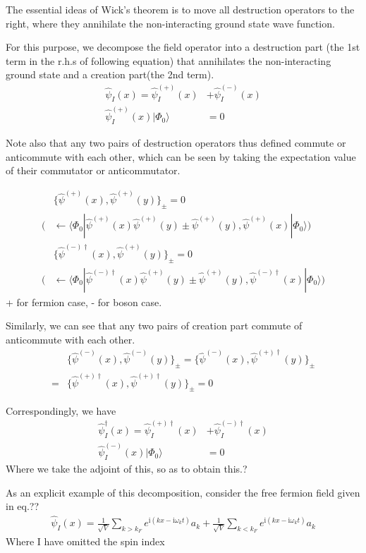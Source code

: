 ﻿\documentclass[twoside]{book}
\numberwithin{equation}{section}
\begin{document}
The essential ideas of Wick's theorem is to move all destruction operators to the right, where they annihilate the non-interacting ground state wave function.

For this purpose, we decompose the field operator into a destruction part (the 1st term in the r.h.s of following equation) that annihilates the non-interacting ground state and a creation part(the 2nd term).
\begin{align}
\hat \psi_{I}(x)=\hat \psi^{(+)}_{I}(x)&+\hat \psi^{(-)}_{I}(x) \nonumber \\
\hat \psi^{(+)}_{I}(x)|\Phi_0\rangle&=0 \nonumber
\end{align}

Note also that any two pairs of destruction operators thus defined commute or anticommute with each other, which can be seen by taking the expectation value of their commutator or anticommutator.

\begin{align}
&\{\hat \psi^{(+)}(x),\hat \psi^{(+)}(y)\}_{\pm}=0 \nonumber \\
\big (&\leftarrow\langle\Phi_0|\hat \psi^{(+)}(x)\hat \psi^{(+)}(y)\pm\hat \psi^{(+)}(y),\hat \psi^{(+)}(x)|\Phi_0\rangle \big) \nonumber \\
&\{\hat \psi^{(-)\dagger}(x),\hat \psi^{(+)}(y)\}_{\pm}=0 \nonumber \\
\big (&\leftarrow\langle\Phi_0|\hat \psi^{(-)\dagger}(x)\hat \psi^{(+)}(y)\pm\hat \psi^{(+)}(y),\hat \psi^{(-)\dagger}(x)|\Phi_0\rangle \big) \nonumber
\end{align} 
+ for fermion case, - for boson case.

Similarly, we can see that any two pairs of creation part commute of anticommute with each other.
\begin{align}
&\{\hat \psi^{(-)}(x),\hat \psi^{(-)}(y)\}_{\pm}=\{\hat \psi^{(-)}(x),\hat \psi^{(+)\dagger}(y)\}_{\pm} \nonumber \\
=&\{\hat \psi^{(+)\dagger}(x),\hat \psi^{(+)\dagger}(y)\}_{\pm}=0 \nonumber 
\end{align}

Correspondingly, we have
\begin{align}
\hat \psi^{\dagger}_{I}(x)=\hat \psi^{(+)\dagger}_{I}(x)&+\hat \psi^{(-)\dagger}_{I}(x) \nonumber \\
\hat \psi^{(-)}_{I}(x)|\Phi_0\rangle&=0 \nonumber
\end{align}
Where we take the adjoint of this, so as to obtain this.?

As an explicit example of this decomposition, consider the free fermion field given in eq.??
\begin{align}
\hat \psi_I(x)=\frac{1}{\sqrt{V}}\sum_{k>k_F} e^{\mathrm{i}(kx-\mathrm{i}\omega_kt)}a_k+\frac{1}{\sqrt{V}}\sum_{k<k_F} e^{\mathrm{i}(kx-\mathrm{i}\omega_kt)}a_k \nonumber
\end{align}
Where I have omitted the spin index
\end{document}
